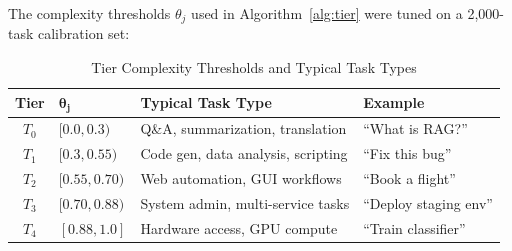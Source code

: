\documentclass[11pt]{article}
\begin{document}
The complexity thresholds $\theta_j$ used in Algorithm~\ref{alg:tier} were
tuned on a 2,000-task calibration set:

\begin{table}[H]
\centering
\caption{Tier Complexity Thresholds and Typical Task Types}
\label{tab:thresholds}
\begin{tabular}{clll}
\toprule
\textbf{Tier} & $\bm{\theta_j}$ & \textbf{Typical Task Type} &
\textbf{Example} \\
\midrule
$T_0$ & $[0.0, 0.3)$ & Q\&A, summarization, translation &
    ``What is RAG?'' \\
$T_1$ & $[0.3, 0.55)$ & Code gen, data analysis, scripting &
    ``Fix this bug'' \\
$T_2$ & $[0.55, 0.70)$ & Web automation, GUI workflows &
    ``Book a flight'' \\
$T_3$ & $[0.70, 0.88)$ & System admin, multi-service tasks &
    ``Deploy staging env'' \\
$T_4$ & $[0.88, 1.0]$ & Hardware access, GPU compute &
    ``Train classifier'' \\
\bottomrule
\end{tabular}
\end{table}
\end{document}
